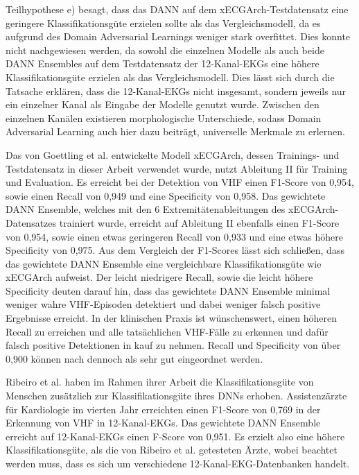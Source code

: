 Teilhypothese e) besagt, dass das \gls{DANN} auf dem xECGArch-Testdatensatz eine geringere Klassifikationsgüte erzielen sollte als das Vergleichsmodell, da es aufgrund des Domain Adversarial Learnings weniger stark overfittet. Dies konnte nicht nachgewiesen werden, da sowohl die einzelnen Modelle als auch beide \gls{DANN} Ensembles auf dem Testdatensatz der 12-Kanal-\gls{EKG}s eine höhere  Klassifikationsgüte erzielen als das Vergleichsmodell. Dies lässt sich durch die Tatsache erklären, dass die 12-Kanal-\gls{EKG}s nicht insgesamt, sondern jeweils nur ein einzelner Kanal als Eingabe der Modelle genutzt wurde. Zwischen den einzelnen Kanälen existieren morphologische Unterschiede, sodass Domain Adversarial Learning auch hier dazu beiträgt, universelle Merkmale zu erlernen.

Das von Goettling et al. \cite{goettling_xecgarch_2024} entwickelte Modell xECGArch, dessen Trainings- und Testdatensatz in dieser Arbeit verwendet wurde, nutzt Ableitung II für Training und Evaluation. Es erreicht bei der Detektion von \gls{VHF} einen F1-Score von 0,954, sowie einen Recall von 0,949 und eine Specificity von 0,958. Das gewichtete \gls{DANN} Ensemble, welches mit den 6 Extremitätenableitungen des xECGArch-Datensatzes trainiert wurde, erreicht auf Ableitung II ebenfalls einen F1-Score von 0,954, sowie einen etwas geringeren Recall von 0,933 und eine etwas höhere Specificity von 0,975. Aus dem Vergleich der F1-Scores lässt sich schließen, dass das gewichtete \gls{DANN} Ensemble eine vergleichbare Klassifikationsgüte wie xECGArch aufweist. Der leicht niedrigere Recall, sowie die leicht höhere Specificity deuten darauf hin, dass das gewichtete \gls{DANN} Ensemble minimal weniger wahre \gls{VHF}-Episoden detektiert und dabei weniger falsch positive Ergebnisse erreicht. In der klinischen Praxis ist wünschenswert, einen höheren Recall zu erreichen und alle tatsächlichen \gls{VHF}-Fälle zu erkennen und dafür falsch positive Detektionen in kauf zu nehmen. Recall und Specificity von über 0,900 können nach \cite{plante_selection_1994} dennoch als sehr gut eingeordnet werden.   

Ribeiro et al. \cite{ribeiro_automatic_2020} haben im Rahmen ihrer Arbeit die Klassifikationsgüte von Menschen zusätzlich zur Klassifikationsgüte ihres \gls{DNN}s erhoben. Assistenzärzte für Kardiologie im vierten Jahr erreichten einen F1-Score von 0,769 in der Erkennung von \gls{VHF} in 12-Kanal-\gls{EKG}s. Das gewichtete \gls{DANN} Ensemble erreicht auf 12-Kanal-\gls{EKG}s einen F-Score von 0,951. Es erzielt also eine höhere Klassifikationsgüte, als die von Ribeiro et al. getesteten Ärzte, wobei beachtet werden muss, dass es sich um verschiedene 12-Kanal-\gls{EKG}-Datenbanken handelt. 

